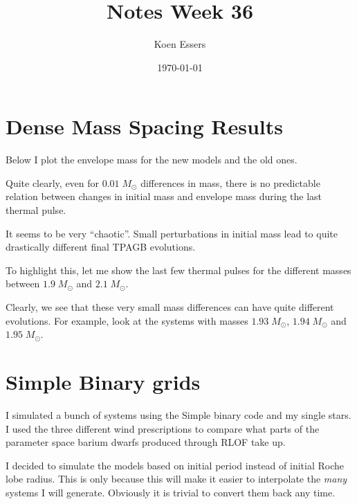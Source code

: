 \documentclass[a4paper,10pt]{article}
\title{Notes Week 36}
\author{Koen Essers}
\date{\today}
\begin{document}
\setuplayout
\section{Dense Mass Spacing Results}

Below I plot the envelope mass for the new models and the old ones.

\begin{figure}[ht]
	\centering
\end{figure}

Quite clearly, even for \(0.01\; M_\odot \) differences in mass, there is no predictable relation between
changes in initial mass and envelope mass during the last thermal pulse.

It seems to be very ``chaotic''.
Small perturbations in initial mass lead to quite drastically different
final TPAGB evolutions.

To highlight this, let me show the last few thermal pulses for the different masses between
\(1.9\; M_\odot \) and \(2.1\; M_\odot \).

\begin{figure}[ht]
	\centering
\end{figure}

Clearly, we see that these very small mass differences can have quite different evolutions.
For example, look at the systems with masses \(1.93\; M_\odot \), \(1.94\; M_\odot \) and \(1.95\; M_\odot \).

\section{Simple Binary grids}

I simulated a bunch of systems using the Simple binary code and my single stars.
I used the three different wind prescriptions to compare what parts of the parameter space
barium dwarfs produced through RLOF take up.

I decided to simulate the models based on initial period instead of initial Roche lobe radius.
This is only because this will make it easier to interpolate the \emph{many} \citet{moe2016} systems
I will generate.
Obviously it is trivial to convert them back any time.
\begin{figure}[ht]
	\centering
\end{figure}
\end{document}

